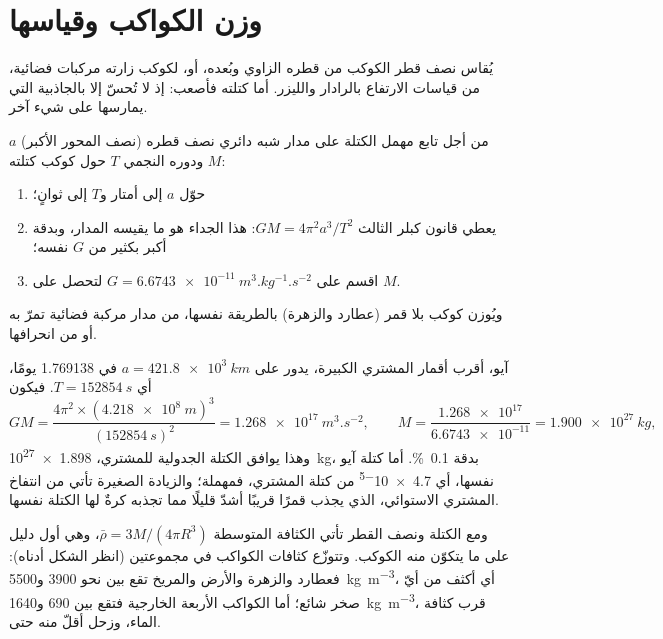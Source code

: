 \section{وزن الكواكب وقياسها}

يُقاس نصف قطر الكوكب من قطره الزاوي وبُعده، أو، لكوكب زارته مركبات فضائية، من قياسات الارتفاع بالرادار والليزر. أما كتلته فأصعب: إذ لا تُحسّ إلا بالجاذبية التي يمارسها على شيء آخر.

\begin{method}\label{met:b1:comparative-planetology:mass}
من أجل تابع مهمل الكتلة على مدار شبه دائري نصف قطره (نصف المحور الأكبر) $a$ ودوره النجمي $T$ حول كوكب كتلته $M$:
\begin{enumerate}
  \item حوّل $a$ إلى أمتار و$T$ إلى ثوانٍ؛
  \item يعطي قانون كبلر الثالث $GM = 4\pi^2a^3/T^2$: هذا الجداء هو ما يقيسه المدار، وبدقة أكبر بكثير من $G$ نفسه؛
  \item اقسم على $G = \qty{6.6743e-11}{m^3.kg^{-1}.s^{-2}}$ لتحصل على $M$.
\end{enumerate}
ويُوزن كوكب بلا قمر (عطارد والزهرة) بالطريقة نفسها، من مدار مركبة فضائية تمرّ به أو من انحرافها.
\end{method}

\begin{example}
آيو، أقرب أقمار المشتري الكبيرة، يدور على $a = \qty{421.8e3}{km}$
في \num{1.769138} يومًا، أي $T = \qty{152854}{s}$. فيكون
\[
  GM = \frac{4\pi^2\times(\qty{4.218e8}{m})^3}{(\qty{152854}{s})^2}
  = \qty{1.268e17}{m^3.s^{-2}}, \qquad
  M = \frac{\num{1.268e17}}{\num{6.6743e-11}} = \qty{1.900e27}{kg},
\]
وهذا يوافق الكتلة الجدولية للمشتري، \qty{1.898e27}{kg}، بدقة \qty{0.1}{\percent}. أما كتلة آيو نفسها، أي \num{4.7e-5} من كتلة المشتري، فمهملة؛ والزيادة الصغيرة تأتي من انتفاخ المشتري الاستوائي، الذي يجذب قمرًا قريبًا أشدّ قليلًا مما تجذبه كرةٌ لها الكتلة نفسها.
\end{example}

ومع الكتلة ونصف القطر تأتي الكثافة المتوسطة $\bar\rho =
3M/(4\pi R^3)$، وهي أول دليل على ما يتكوّن منه الكوكب. وتتوزّع كثافات الكواكب في مجموعتين (انظر الشكل أدناه): فعطارد والزهرة والأرض والمريخ تقع بين نحو \num{3900} و\qty{5500}{kg.m^{-3}}، أي أكثف من أيّ صخر شائع؛ أما الكواكب الأربعة الخارجية فتقع بين \num{690} و\qty{1640}{kg.m^{-3}}، قرب كثافة الماء، وزحل أقلّ منه حتى.


